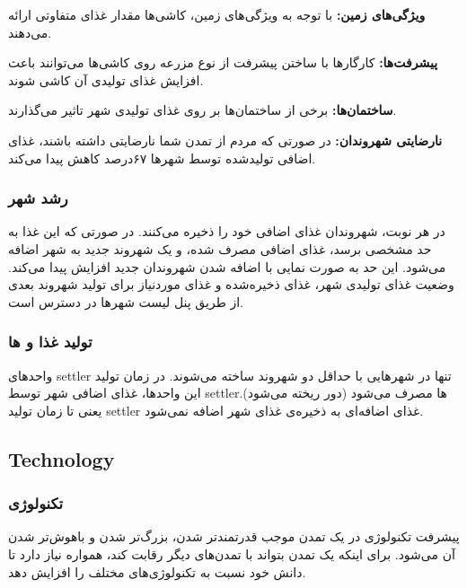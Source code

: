 \documentclass[]{article}
\begin{document}
\noindent \textbf{ویژگی‌های زمین:}
با توجه به ویژگی‌های زمین، کاشی‌ها مقدار غذای متفاوتی ارائه می‌دهند.

\noindent \textbf{پیشرفت‌ها:}
کارگارها با ساختن پیشرفت از نوع مزرعه روی کاشی‌ها می‌توانند باعث افزایش غذای تولیدی آن کاشی شوند.

\noindent \textbf{ساختمان‌ها:}
برخی از ساختمان‌ها بر روی غذای تولیدی شهر تاثیر می‌گذارند.

\noindent \textbf{نارضایتی شهروندان:}
در صورتی که مردم از تمدن شما نارضایتی داشته باشند، غذای اضافی تولید‌شده توسط شهرها ۶۷درصد کاهش پیدا می‌کند.

\subsubsection*{{\titr رشد شهر}}
در هر نوبت، شهروندان غذای اضافی خود را ذخیره می‌کنند. در صورتی که این غذا به حد مشخصی برسد، غذای اضافی مصرف شده، و یک شهروند جدید به شهر اضافه می‌شود. این حد به صورت نمایی با اضافه شدن شهروندان جدید افزایش پیدا می‌کند. وضعیت غذای تولیدی شهر، غذای ذخیره‌شده و غذای موردنیاز برای تولید شهروند بعدی از طریق پنل لیست شهرها در دسترس است.

\subsubsection*{{\titr تولید غذا و ها}}
واحدهای settler تنها در شهرهایی با حداقل دو شهروند ساخته می‌شوند. در زمان تولید این واحدها، غذای اضافی شهر توسط settlerها مصرف می‌شود (دور ریخته می‌شود). یعنی تا زمان تولید settler غذای اضافه‌ای به ذخیره‌ی غذای شهر اضافه نمی‌شود.



\subsection*{{\titr Technology}}


\subsubsection*{{\titr تکنولوژی}}
پیشرفت تکنولوژی در یک تمدن موجب قدرتمندتر شدن، بزرگ‌تر شدن و باهوش‌تر شدن آن می‌شود. برای اینکه یک تمدن بتواند با تمدن‌های دیگر رقابت کند، همواره نیاز دارد تا دانش خود نسبت به تکنولوژی‌های مختلف را افزایش دهد.
\end{document}
